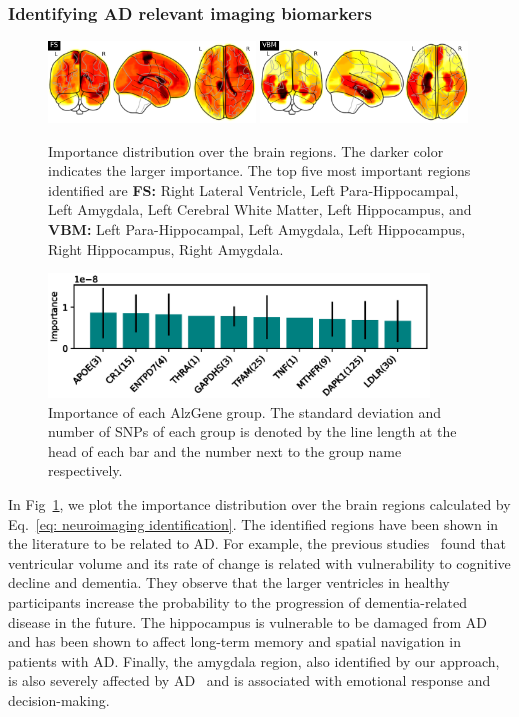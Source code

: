 \subsubsection{Identifying AD relevant imaging biomarkers}
\begin{figure}
    \includegraphics[width=0.49\textwidth]{images/biomarker-identification/fs.png}
    \includegraphics[width=0.49\textwidth]{images/biomarker-identification/vbm.png}
    \caption{Importance distribution over the brain regions. The darker color indicates the larger importance. The top five most important regions identified are {\bf FS:} Right Lateral Ventricle, Left Para-Hippocampal, Left Amygdala, Left Cerebral White Matter, Left Hippocampus, and {\bf VBM:} Left Para-Hippocampal, Left Amygdala, Left Hippocampus, Right Hippocampus, Right Amygdala.}
    \label{fig: brain map}
\end{figure}
\begin{figure}
    \centering
    \includegraphics[width=0.9\textwidth]{images/biomarker-identification/alzgene-same-color.eps}
    \caption{Importance of each AlzGene group. The standard deviation and number of SNPs of each group is denoted by the line length at the head of each bar and the number next to the group name respectively.}\label{fig: AlzGene}
\end{figure}
In Fig~\ref{fig: brain map}, we plot the importance distribution over the brain regions calculated by Eq.~\eqref{eq: neuroimaging identification}. The identified regions have been shown in the literature to be related to AD. For example, the previous studies~\cite{carmichael2007ventricular} found that ventricular volume and its rate of change is related with vulnerability to cognitive decline and dementia. 
They observe that the larger ventricles in healthy participants increase the probability to the progression of dementia-related disease in the future. The hippocampus is vulnerable to be damaged from AD~\cite{mu2011adult} and has been shown to affect long-term memory and spatial navigation in patients with AD. Finally, the amygdala region, also identified by our approach, is also severely affected by AD~\cite{poulin2011amygdala} and is associated with emotional response and decision-making.
